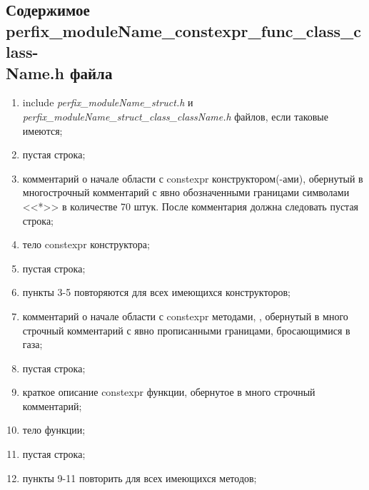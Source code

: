 \subsection{Содержимое perfix\-\_moduleName\-\_constexpr\-\_func\-\_class\-\_class-\\\-Name.h файла}\label{p:conf:ch}
\begin{enumerate}
	\item include \textit{perfix\_moduleName\_struct.h} и \textit{perfix\_moduleName\_struct\_class\_className.h} файлов, если таковые имеются;
	\item пустая строка;
	\item комментарий о начале области с constexpr конструктором(-ами), обернутый в многострочный комментарий с явно обозначенными границами символами <<*>> в количестве 70 штук. После комментария должна следовать  пустая строка;
	\item тело constexpr конструктора;
	\item пустая строка;
	\item пункты 3-5 повторяются для всех имеющихся конструкторов;
	\item комментарий о начале области с constexpr методами, , обернутый в много строчный комментарий с явно прописанными границами, бросающимися в газа;
	\item пустая строка;
	\item краткое описание constexpr функции, обернутое в много строчный комментарий;
	\item тело функции;
	\item пустая строка;
	\item пункты 9-11 повторить для всех имеющихся методов;
	
\end{enumerate}
